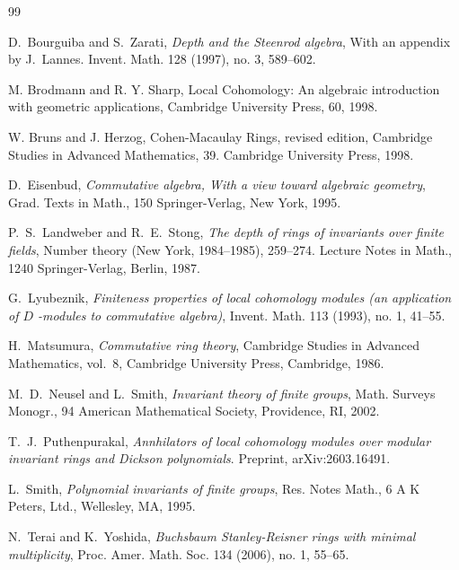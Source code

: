 \documentclass{amsart}
\theoremstyle{plain}
\theoremstyle{definition}
\theoremstyle{remark}
\begin{document}
\begin{thebibliography} {99}



D.~Bourguiba and S.~Zarati,
\emph{Depth and the Steenrod algebra},
With an appendix by J.~Lannes.
Invent. Math. 128 (1997), no. 3, 589--602.

  M. Brodmann and R. Y. Sharp,
Local Cohomology: An algebraic introduction with geometric applications,
Cambridge University Press, 60, 1998.

  W. Bruns and J. Herzog,
Cohen-Macaulay Rings, revised edition,
Cambridge Studies in Advanced Mathematics, 39.
Cambridge University Press, 1998.

D.~Eisenbud, 
\emph{Commutative algebra,
With a view toward algebraic geometry},
Grad. Texts in Math., 150
Springer-Verlag, New York, 1995.

P.~S.~Landweber and R.~E.~Stong,
\emph{The depth of rings of invariants over finite fields},
Number theory (New York, 1984–1985), 259--274.
Lecture Notes in Math., 1240
Springer-Verlag, Berlin, 1987.

G.~Lyubeznik,
 \emph{Finiteness properties of local cohomology modules (an application of  $D$ -modules to commutative algebra)},
Invent. Math. 113 (1993), no. 1, 41--55.


H.~Matsumura, \emph{Commutative ring theory}, Cambridge Studies in Advanced
  Mathematics, vol.~8, Cambridge University Press, Cambridge, 1986.


M.~D.~Neusel and  L.~Smith,
\emph{Invariant theory of finite groups},
Math. Surveys Monogr., 94
American Mathematical Society, Providence, RI, 2002.

T.~J.~Puthenpurakal,
\emph{Annhilators of local cohomology modules over modular invariant rings and Dickson polynomials}.
Preprint,	arXiv:2603.16491.

L.~Smith,
\emph{Polynomial invariants of finite groups},
Res. Notes Math., 6
A K Peters, Ltd., Wellesley, MA, 1995.

N.~Terai and K.~Yoshida, 
\emph{Buchsbaum Stanley-Reisner rings with minimal multiplicity},
Proc. Amer. Math. Soc. 134 (2006), no. 1, 55--65.



\end{thebibliography}
\end{document}
